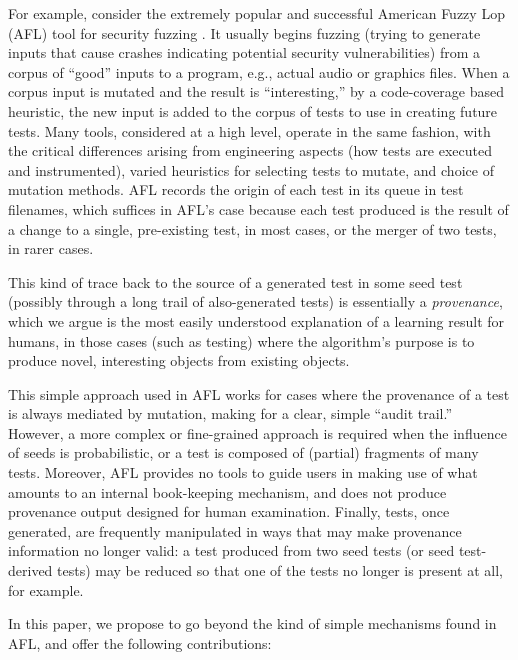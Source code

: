 \documentclass[final]{article}
\begin{document}
For example, consider the extremely popular and successful American
Fuzzy Lop (AFL) tool
for security fuzzing \cite{aflfuzz}.  It usually begins fuzzing
(trying to generate inputs that cause crashes indicating potential
security vulnerabilities) from a corpus of ``good'' inputs to a
program, e.g., actual audio or graphics files.  When a corpus input is mutated and the result is
``interesting,'' by a code-coverage based heuristic, the new input is
added to the corpus of tests to use in creating future tests.  Many
tools, considered at a high level, operate in the same fashion, with the
critical differences arising from engineering aspects (how tests are executed
and instrumented), varied heuristics for selecting tests to mutate,
and choice of mutation methods.  AFL records the origin of each test
in its queue in test filenames, which suffices in AFL's case because
each test produced is the result of a change to a single, pre-existing
test, in most cases, or the merger of two tests, in rarer cases.

This kind of trace back to the source of a generated test in some seed
test (possibly through a long trail of also-generated tests) is
essentially a \emph{provenance}, which we argue is the most easily
understood explanation of a learning result for humans, in those cases
(such as testing) where the algorithm's purpose is to produce
novel, interesting objects from existing objects.

This simple approach used in AFL works for cases where the provenance of a test is
always mediated by mutation, making for a clear, simple ``audit
trail.''  However, a more complex or fine-grained approach is
required when the influence of seeds is probabilistic, or a test is
composed of (partial) fragments of many tests.  Moreover, AFL provides
no tools to guide users in making use of what amounts to an internal
book-keeping mechanism, and does not produce provenance output designed for human
examination.
Finally, tests, once generated, are frequently manipulated in ways
that may make provenance information no longer valid:  a test produced
from two seed tests (or seed test-derived tests) may be reduced
\cite{DD} so that one of the tests no longer is present at all, for example.

In this paper, we propose to go beyond the kind of simple mechanisms
found in AFL, and
offer the following contributions:
\end{document}
